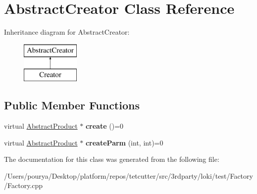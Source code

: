\hypertarget{classAbstractCreator}{}\section{Abstract\+Creator Class Reference}
\label{classAbstractCreator}
Inheritance diagram for Abstract\+Creator\+:\begin{figure}[H]
\begin{center}
\leavevmode
\includegraphics[height=2.000000cm]{classAbstractCreator}
\end{center}
\end{figure}
\subsection*{Public Member Functions}
\begin{DoxyCompactItemize}
\item 
\hypertarget{classAbstractCreator_aca16afb487dd6bed261c54f8c5ed95e4}{}virtual \hyperlink{classAbstractProduct}{Abstract\+Product} $\ast$ {\bfseries create} ()=0\label{classAbstractCreator_aca16afb487dd6bed261c54f8c5ed95e4}

\item 
\hypertarget{classAbstractCreator_af0732c2df4227ccb167e13f91c9f664c}{}virtual \hyperlink{classAbstractProduct}{Abstract\+Product} $\ast$ {\bfseries create\+Parm} (int, int)=0\label{classAbstractCreator_af0732c2df4227ccb167e13f91c9f664c}

\end{DoxyCompactItemize}


The documentation for this class was generated from the following file\+:\begin{DoxyCompactItemize}
\item 
/\+Users/pourya/\+Desktop/platform/repos/tetcutter/src/3rdparty/loki/test/\+Factory/Factory.\+cpp\end{DoxyCompactItemize}
